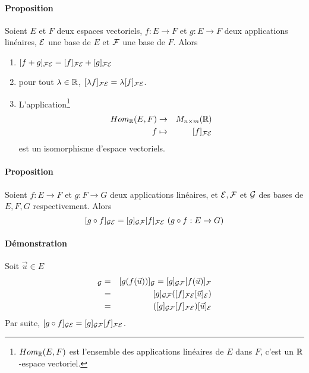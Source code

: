 \paragraph{Proposition} Soient $E$ et $F$ deux espaces vectoriels, $f: E \rightarrow F$ et $g: E \rightarrow F$ deux applications linéaires, $\mathcal{E}$ une base de $E$ et $\mathcal{F}$ une base de $F$. Alors
\begin{enumerate}
  \item $[f+ g]_{\mathcal{F} \mathcal{E}} = [f]_{\mathcal{F} \mathcal{E}} + [g]_{\mathcal{F} \mathcal{E}}$
  \item pour tout $\lambda \in \mathbb{R}$, $[\lambda f]_{\mathcal{F} \mathcal{E}} = \lambda [f]_{\mathcal{F} \mathcal{E}}$.
  \item L'application\footnote{$Hom_{\mathbb{R}}(E, F)$ est l'ensemble des applications linéaires de $E$ dans $F$, c'est un $\mathbb{R}$-espace vectoriel.}
    \begin{eqnarray*}
      Hom_{\mathbb{R}}(E, F) &\rightarrow& M_{n\times m}(\mathbb{R}) \\
      f &\mapsto& [f]_{\mathcal{F} \mathcal{E}}
    \end{eqnarray*}
    est un isomorphisme d'espace vectoriels.
\end{enumerate}

\paragraph{Proposition} Soient $f: E \rightarrow F$ et $g: F \rightarrow G$ deux applications linéaires, et $\mathcal{E}, \mathcal{F}$ et $\mathcal{G}$ des bases de $E, F, G$ respectivement. Alors
$$[g \circ f]_{\mathcal{G} \mathcal{E}} = [g]_{\mathcal{G} \mathcal{F}} [f]_{\mathcal{F} \mathcal{E}} ~ (g \circ f: E \rightarrow G)$$

\paragraph{Démonstration} Soit $\vec{u} \in E$
\begin{eqnarray*}
  [(g \circ f)(\vec{u})]_{\cG} &=& [g(f(\vec{u}))]_{\cG} = [g]_{\cG \cF} [f(\vec{u})]_{\cF} \\
    &=& [g]_{\cG \cF} ([f]_{\cF \cE} [\vec{u}]_{\cE}) \\
    &=& ([g]_{\cG \cF} [f]_{\cF \cE}) [\vec{u}]_{\cE} 
\end{eqnarray*}
Par suite, $[g \circ f]_{\mathcal{G} \mathcal{E}} = [g]_{\mathcal{G} \mathcal{F}} [f]_{\mathcal{F} \mathcal{E}}$.

